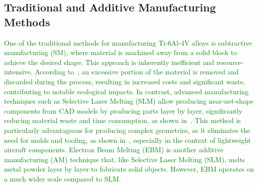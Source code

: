 \documentclass[preprint,12pt]{elsarticle}
\begin{document}
\subsection{Traditional and Additive Manufacturing Methods}
\textcolor{green}{One of the traditional methods for manufacturing Ti-6Al-4V alloys is subtractive manufacturing (SM), where material is machined away from a solid block to achieve the desired shape. This approach is inherently inefficient and resource-intensive. According to~\cite{peng2017toward}, an excessive portion of the material is removed and discarded during the process, resulting in increased costs and significant waste, contributing to notable ecological impacts.
In contrast, advanced manufacturing techniques such as Selective Laser Melting (SLM) allow producing near-net-shape components from CAD models by producing parts layer by layer, significantly reducing material waste and time consumption, as shown in~\cite{fatimah2013sustainable}. This method is particularly advantageous for producing complex geometries, as it eliminates the need for molds and tooling, as shown in~\cite{huang2016energy}, especially in the context of lightweight aircraft components.
Electron Beam Melting (EBM) is another additive manufacturing (AM) technique that, like Selective Laser Melting (SLM), melts metal powder layer by layer to fabricate solid objects.
However, EBM operates on a much wider scale compared to SLM.}
\end{document}
